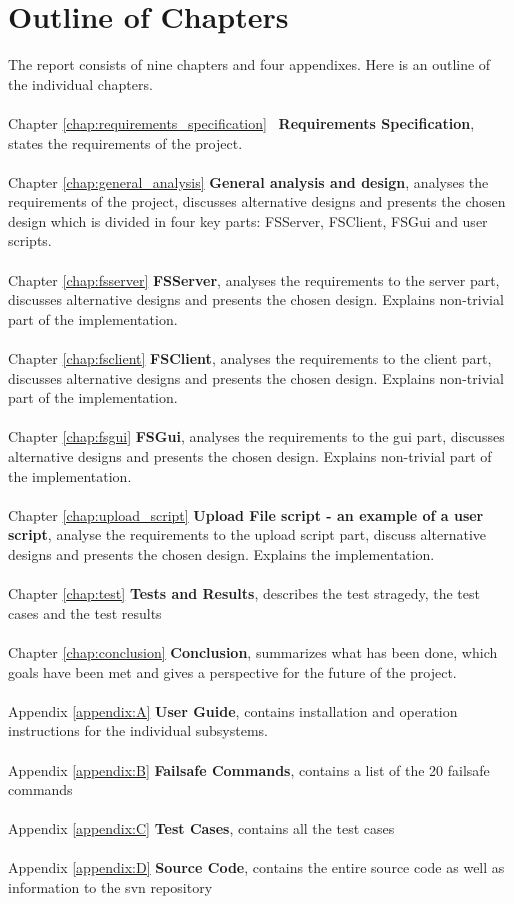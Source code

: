 \section{Outline of Chapters}
The report consists of nine chapters and four appendixes. Here is an outline of the individual chapters.
\\ \\
Chapter \ref{chap:requirements_specification} \ \textbf{Requirements Specification}, states the requirements of the project.
\\ \\
Chapter \ref{chap:general_analysis} \textbf{General analysis and design}, analyses the requirements of the project, discusses alternative designs and presents the chosen design which is divided in four key parts: FSServer, FSClient, FSGui and user scripts.
\\ \\
Chapter \ref{chap:fsserver} \textbf{FSServer}, analyses the requirements to the server part, discusses alternative designs and presents the chosen design. Explains non-trivial part of the implementation.
\\ \\
Chapter \ref{chap:fsclient} \textbf{FSClient}, analyses the requirements to the client part, discusses alternative designs and presents the chosen design. Explains non-trivial part of the implementation.
\\ \\
Chapter \ref{chap:fsgui} \textbf{FSGui}, analyses the requirements to the gui part, discusses alternative designs and presents the chosen design. Explains non-trivial part of the implementation.
\\ \\
Chapter \ref{chap:upload_script} \textbf{Upload File script - an example of a user script}, analyse the requirements to the upload script part, discuss alternative designs and presents the chosen design. Explains the implementation.
\\ \\
Chapter \ref{chap:test} \textbf{Tests and Results}, describes the test stragedy, the test cases and the test results
\\ \\
Chapter \ref{chap:conclusion} \textbf{Conclusion}, summarizes what has been done, which goals have been met and gives a perspective for the future of the project.
\\ \\
Appendix \ref{appendix:A} \textbf{User Guide}, contains installation and operation instructions for the individual subsystems.
\\ \\
Appendix \ref{appendix:B} \textbf{Failsafe Commands}, contains a list of the 20 failsafe commands
\\ \\
Appendix \ref{appendix:C} \textbf{Test Cases}, contains all the test cases
\\ \\
Appendix \ref{appendix:D} \textbf{Source Code}, contains the entire source code as well as information to the svn repository
